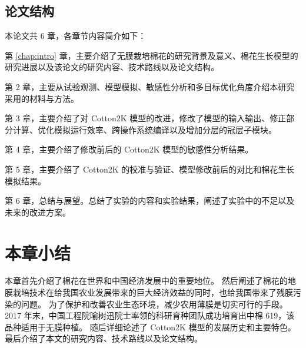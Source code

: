 \subsection{论文结构}
本论文共 6 章，各章节内容简介如下：

第 \ref{chap:intro} 章，主要介绍了无膜栽培棉花的研究背景及意义、棉花生长模型的研究进展以及该论文的研究内容、技术路线以及论文结构。

第 2 章，主要从试验观测、模型模拟、敏感性分析和多目标优化角度介绍本研究采用的材料与方法。

第 3 章，主要介绍了对 Cotton2K 模型的改进，修改了模型的输入输出、修正部分计算、优化模拟运行效率、跨操作系统编译以及增加分层的冠层子模块。

第 4 章，主要介绍了修改前后的 Cotton2K 模型的敏感性分析结果。

第 5 章，主要介绍了 Cotton2K 的校准与验证、模型修改前后的对比和棉花生长模拟结果。

第 6 章，总结与展望。总结了实验的内容和实验结果，阐述了实验中的不足以及未来的改进方案。

\section{本章小结}
本章首先介绍了棉花在世界和中国经济发展中的重要地位。%
然后阐述了棉花的地膜栽培技术在给我国农业发展带来的巨大经济效益的同时，也给我国带来了残膜污染的问题。%
为了保护和改善农业生态环境，减少农用薄膜是切实可行的手段。%
2017 年末，中国工程院喻树迅院士率领的科研育种团队成功培育出中棉 619，该品种适用于无膜种植。%
随后详细论述了 Cotton2K 模型的发展历史和主要特色。
最后介绍了本文的研究内容、技术路线以及论文结构。
